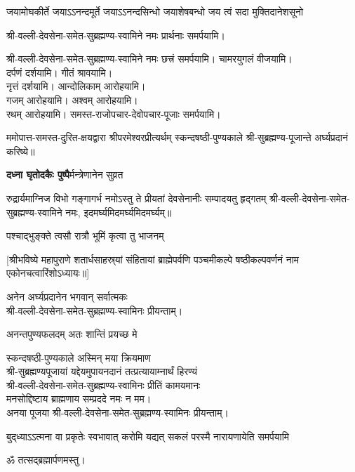 \begin{center}
{जयामोघकीर्ते जयाऽऽनन्दमूर्ते}
{जयाऽऽनन्दसिन्धो जयाशेषबन्धो}
{जय त्वं सदा मुक्तिदानेशसूनो}

श्री-वल्ली-देवसेना-समेत-सुब्रह्मण्य-स्वामिने नमः प्रार्थनाः समर्पयामि।

श्री-वल्ली-देवसेना-समेत-सुब्रह्मण्य-स्वामिने नमः छत्त्रं समर्पयामि।
चामरयुगलं वीजयामि।\\
दर्पणं दर्शयामि। गीतं श्रावयामि। \\
नृत्तं दर्शयामि। आन्दोलिकाम् आरोहयामि।\\
गजम् आरोहयामि। अश्वम् आरोहयामि।\\
रथम् आरोहयामि। समस्त-राजोपचार-देवोपचार-पूजाः समर्पयामि।


ममोपात्त-समस्त-दुरित-क्षयद्वारा श्रीपरमेश्वरप्रीत्यर्थम् स्कन्दषष्ठी-पुण्यकाले श्री-सुब्रह्मण्य-पूजान्ते अर्घ्यप्रदानं करिष्ये॥

\medskip

{\textbf{दध्ना घृतोदकैः पुष्पै}र्मन्त्रेणानेन सुव्रत}

{रुद्रार्यमाग्निज विभो गङ्गागर्भ नमोऽस्तु ते}
{प्रीयतां देवसेनानीः सम्पादयतु हृद्गतम्}
श्री-वल्ली-देवसेना-समेत-सुब्रह्मण्य-स्वामिने नमः, इदमर्घ्यमिदमर्घ्यमिदमर्घ्यम्॥\medskip

{पश्चाद्भुङ्क्ते त्वसौ रात्रौ भूमिं कृत्वा तु भाजनम्}

[श्रीभविष्ये महापुराणे शतार्धसाहस्र्यां संहितायां ब्राह्मेपर्वणि पञ्चमीकल्पे षष्ठीकल्पवर्णनं नाम एकोनचत्वारिंशोऽध्यायः॥]


अनेन अर्घ्यप्रदानेन भगवान् सर्वात्मकः\\ श्री-वल्ली-देवसेना-समेत-सुब्रह्मण्य-स्वामिनः प्रीयन्ताम्।\medskip

{अनन्तपुण्यफलदम् अतः शान्तिं प्रयच्छ मे}

स्कन्दषष्ठी-पुण्यकाले अस्मिन् मया क्रियमाण\\
श्री-सुब्रह्मण्यपूजायां यद्देयमुपायनदानं तत्प्रत्यायाम्नार्थं हिरण्यं\\
श्री-वल्ली-देवसेना-समेत-सुब्रह्मण्य-स्वामिनः प्रीतिं कामयमानः\\
मनसोद्दिष्टाय ब्राह्मणाय सम्प्रददे नमः न मम।\\ 
अनया पूजया श्री-वल्ली-देवसेना-समेत-सुब्रह्मण्य-स्वामिनः प्रीयन्ताम्। 
 

{बुद्‌ध्याऽऽत्मना वा प्रकृतेः स्वभावात्}
{करोमि यद्यत् सकलं परस्मै}
{नारायणायेति समर्पयामि}

ॐ तत्सद्ब्रह्मार्पणमस्तु।

\end{center}